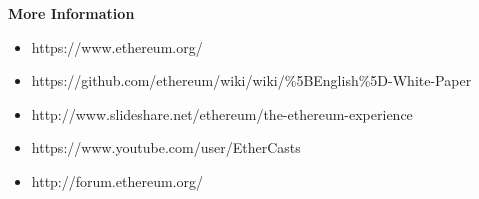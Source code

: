 \documentclass{beamer}
\begin{document}
\begin{frame}
\textbf{More Information}
\begin{itemize}
  \item{https://www.ethereum.org/}
  \item{https://github.com/ethereum/wiki/wiki/\%5BEnglish\%5D-White-Paper}
  \item{http://www.slideshare.net/ethereum/the-ethereum-experience}
  \item{https://www.youtube.com/user/EtherCasts}
  \item{http://forum.ethereum.org/}
\end{itemize}
\end{frame}
\end{document}

